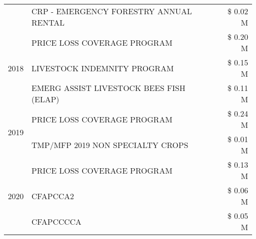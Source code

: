 \begin{tabular}{llr}
 & CRP - EMERGENCY FORESTRY ANNUAL RENTAL & \$ 0.02 M \\
\cline{1-3}
\multirow[t]{3}{*}{2018} & PRICE LOSS COVERAGE PROGRAM & \$ 0.20 M \\
 & LIVESTOCK INDEMNITY PROGRAM & \$ 0.15 M \\
 & EMERG ASSIST LIVESTOCK BEES FISH (ELAP) & \$ 0.11 M \\
\cline{1-3}
\multirow[t]{2}{*}{2019} & PRICE LOSS COVERAGE PROGRAM & \$ 0.24 M \\
 & TMP/MFP 2019 NON SPECIALTY CROPS & \$ 0.01 M \\
\cline{1-3}
\multirow[t]{3}{*}{2020} & PRICE LOSS COVERAGE PROGRAM & \$ 0.13 M \\
 & CFAPCCA2 & \$ 0.06 M \\
 & CFAPCCCCA & \$ 0.05 M \\
\cline{1-3}
\bottomrule
\end{tabular}
